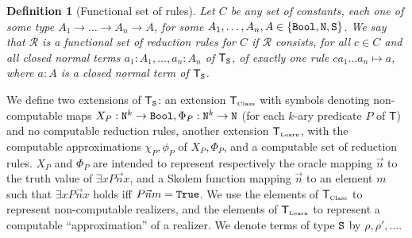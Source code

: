 \documentclass[copyright,creativecommons]{eptcs}
\newcommand{\Nat}                      { {\tt N} }
\newcommand{\Bool}                     { {\tt Bool} }
\newcommand{\State}                    { {\tt S} }
\newcommand{\SystemT}                  {\mathsf{T}}
\newcommand{\True}                     { {\tt{True}} }
\newcommand{\Class}                    {\mbox{\tiny Class}}
\newcommand{\Learn}                    {\mbox{\tiny Learn}}
\newcommand{\SystemTClass}             {{\SystemT_{\Class}}}
\newcommand{\SystemTLearn}             {{\SystemT_{\Learn}}}
\newtheorem{definition}{Definition}
\begin{document}
\begin{definition}[Functional set of rules]\label{definition-functional}
Let $C$ be any set of constants, each one of some type $A_1\rightarrow \ldots \rightarrow A_n\rightarrow A$, for some $A_1,\ldots,A_n, A \in\{ \Bool, \Nat, \State\}$. We say that $\mathcal{R}$ is a {\em functional set of reduction rules} for $C$ if $\mathcal{R}$ consists, for all $c\in C$ and all closed normal terms ${a_1}:A_1,\ldots, {a_n}:A_n$ of $\SystemT_\State$, of exactly one rule $c {a_1}\ldots {a_n}\mapsto {a}$, where ${a}:A$ is a closed normal term of $\SystemT_\State$.
\end{definition}
We define two extensions of $\SystemT_\State$: an extension $\SystemTClass$ with symbols denoting non-computable maps $X_P:\Nat^k\rightarrow \Bool, \Phi_P: \Nat^k\rightarrow \Nat$ (for each $k$-ary predicate $P$ of $\SystemT$) and no computable reduction rules, another extension $\SystemTLearn$, with the computable approximations $\chi_P,\phi_P$ of $X_P, \Phi_P$, and a computable set of reduction rules. $X_P$ and $\Phi_P$ are intended to represent respectively the oracle mapping $\vec{n}$ to the truth value of $\exists x P\vec{n}x$,  and a Skolem function mapping $\vec{n}$ to an element $m$ such that $\exists x P\vec{n}x$ holds iff $P\vec{n}m=\True$.  We use the elements of $\SystemTClass$ to represent non-computable realizers, and the elements of $\SystemTLearn$ to represent a computable ``approximation'' of a realizer. We denote terms of type $\State$ by $\rho, \rho', \ldots$.
\end{document}
